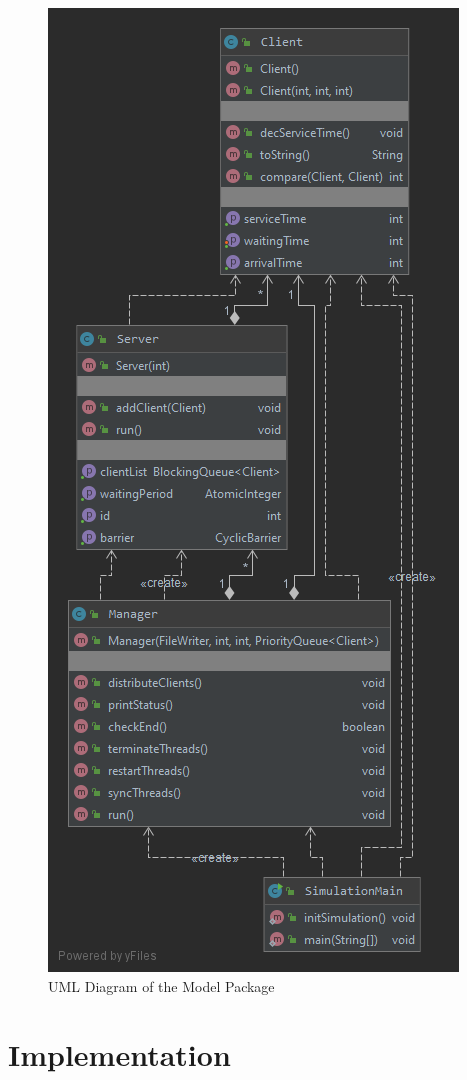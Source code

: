 \documentclass[10pt,a4paper]{article}
\begin{document}
\begin{figure}[!htb]
\centering
\includegraphics[scale=0.30]{package.png}
\caption{UML Diagram of the Model Package}
\end{figure}
\FloatBarrier
\section{Implementation}
\end{document}
